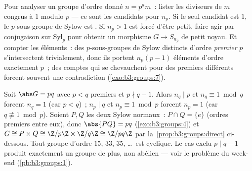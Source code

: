 \begin{method}\label{met:b3:groups:sylowmethod}
Pour analyser un groupe d'ordre donné $n = p^a m$~: lister les
diviseurs de $m$ congrus à $1$ modulo $p$ --- ce sont les
candidats pour $n_p$. Si le seul candidat est $1$, le
$p$-sous-groupe de Sylow est . Si $n_p > 1$ est forcé d'être
petit, faire agir par conjugaison sur $\mathrm{Syl}_p$ pour
obtenir un morphisme $G \to S_{n_p}$ de petit noyau. Et compter
les éléments~: des $p$-sous-groupes de Sylow distincts d'ordre
\emph{premier} $p$ s'intersectent trivialement, donc ils portent
$n_p(p-1)$ éléments d'ordre exactement $p$~; des comptes qui se
chevauchent pour des premiers différents forcent souvent une
contradiction (\cref{exo:b3:groups:7}).
\end{method}

\begin{example}\label{ex:b3:groups:pq}
Soit $\abs G = pq$ avec $p < q$ premiers et $p \nmid q - 1$. Alors
$n_q \mid p$ et $n_q \equiv 1 \bmod q$ forcent $n_q = 1$ (car $p <
q$)~; $n_p \mid q$ et $n_p \equiv 1 \bmod p$ forcent $n_p = 1$
(car $q \not\equiv 1 \bmod p$). Soient $P, Q$ les deux Sylow
normaux~: $P \cap Q = \{e\}$ (ordres premiers entre eux), donc
$\abs{PQ} = pq$ (\cref{exo:b3:groups:4}) et $G \cong P \times Q
\cong \Z/p\Z \times \Z/q\Z \cong \Z/pq\Z$ par
la~\cref{prop:b3:groups:direct} ci-dessous. Tout groupe d'ordre
$15$, $33$, $35$, \dots\ est cyclique. Le cas exclu $p \mid q -
1$ produit exactement un groupe de plus, non abélien --- voir le
problème du week-end (\cref{pb:b3:groups:1}).
\end{example}

